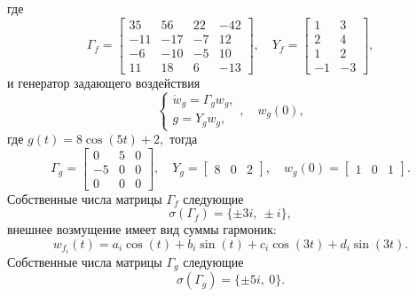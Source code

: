 где
\begin{equation*}
    \Gamma_f=\begin{bmatrix}
        35 &56& 22& -42\\
        -11& -17 &-7 &12\\
        -6 &-10& -5& 10\\
        11 &18 &6 &-13
    \end{bmatrix},\quad
    Y_f=\begin{bmatrix}
        1 &3\\
        2& 4\\
        1 &2\\
        -1 &-3
    \end{bmatrix},
\end{equation*}
и генератор  задающего воздействия
\begin{equation}
    \label{eq:sys1g}
    \begin{cases}
        \dot w_g=\Gamma_gw_g,\\
        g=Y_gw_g,
    \end{cases},\quad
    w_g(0),
\end{equation}
где $g(t)=8\cos(5t)+2,$ тогда
\begin{equation*}
    \Gamma_g=\begin{bmatrix}
        0 & 5 & 0 \\
        -5& 0 & 0 \\
        0 & 0 & 0
    \end{bmatrix},\quad
    Y_g=\begin{bmatrix}
        8 & 0 & 2
    \end{bmatrix},\quad
    w_g(0)=\begin{bmatrix}
        1 & 0 & 1
    \end{bmatrix}.
\end{equation*}
Собственные числа матрицы $\Gamma_f$ следующие
\begin{equation}
    \label{eq:specGf}
    \sigma(\Gamma_f)=\{\pm3i,\ \pm i\},
\end{equation}
внешнее возмущение имеет вид суммы гармоник:
\begin{equation*}
    w_{f_i}(t)=a_i\cos(t)+b_i\sin(t) + c_i\cos(3t)+d_i\sin(3t).
\end{equation*}
Собственные числа матрицы $\Gamma_g$ следующие
\begin{equation}
    \label{eq:specGg}
    \sigma(\Gamma_g)=\{\pm5i,\ 0\}.
\end{equation}
